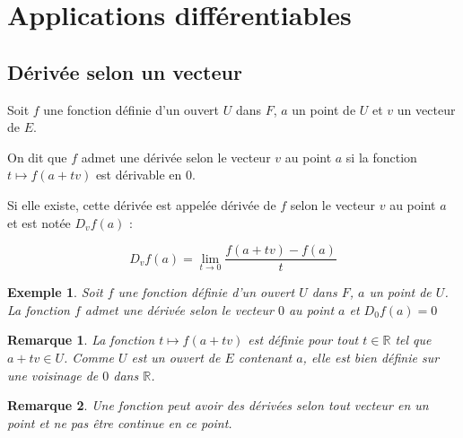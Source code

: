\documentclass[a4paper,12pt]{book}
\newcommand{\Def}[2]{\begin{tcolorbox}[sharp corners, colback=white,colframe=blue!90!black!75, title=Définition : #1]#2\end{tcolorbox}}
\newtheorem{Exe}{Exemple}[section]
\newtheorem{Rem}{Remarque}[section]
\def\R{\mathbb{R}}
\begin{document}
\section{Applications différentiables}
\subsection{Dérivée selon un vecteur}
\Def{}{Soit $f$ une fonction définie d'un ouvert $U$ dans $F$, $a$ un point de $U$ et $v$ un vecteur de $E$.
\par On dit que $f$ admet une dérivée selon le vecteur $v$ au point $a$ si la fonction $t\mapsto f(a+tv)$ est dérivable en $0$.
\par Si elle existe, cette dérivée est appelée dérivée de $f$ selon le vecteur $v$ au point $a$ et est notée $D_vf(a)$ :
\par $$D_vf(a) = \lim\limits_{t\to 0}\frac{f(a+tv)-f(a)}{t}$$}
\begin{Exe}
Soit $f$ une fonction définie d'un ouvert $U$ dans $F$, $a$ un point de $U$. La fonction $f$ admet une dérivée selon le vecteur $0$ au point $a$ et $D_0f(a) = 0$
\end{Exe}
\begin{Rem}
La fonction $t\mapsto f(a+tv)$ est définie pour tout $t\in\R$ tel que $a+tv\in U$. Comme $U$ est un ouvert de $E$ contenant $a$, elle est bien définie sur une voisinage de $0$ dans $\R$.
\end{Rem}
\begin{Rem}
Une fonction peut avoir des dérivées selon tout vecteur en un point et ne pas être continue en ce point.
\end{Rem}
\end{document}
